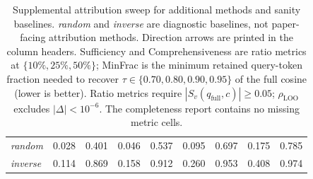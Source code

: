 \begin{table}[t]
\begin{tabular}{lrrrrrrrr}
\textit{random} & 0.028 & 0.401 & 0.046 & 0.537 & 0.095 & 0.697 & 0.175 & 0.785 \\
\textit{inverse} & 0.114 & 0.869 & 0.158 & 0.912 & 0.260 & 0.953 & 0.408 & 0.974 \\
\bottomrule
\end{tabular}
\caption{Supplemental attribution sweep for additional methods and sanity baselines. \textit{random} and \textit{inverse} are diagnostic baselines, not paper-facing attribution methods. Direction arrows are printed in the column headers. Sufficiency and Comprehensiveness are ratio metrics at $\{10\%, 25\%, 50\%\}$; MinFrac is the minimum retained query-token fraction needed to recover $\tau \in \{0.70, 0.80, 0.90, 0.95\}$ of the full cosine (lower is better). Ratio metrics require $|S_v(q_{\text{full}}, c)| \ge 0.05$; $\rho_{\text{LOO}}$ excludes $|\Delta| < 10^{-6}$. The completeness report contains no missing metric cells.}
\label{tab:attribution_sweep_supplemental_methods}
\end{table}
